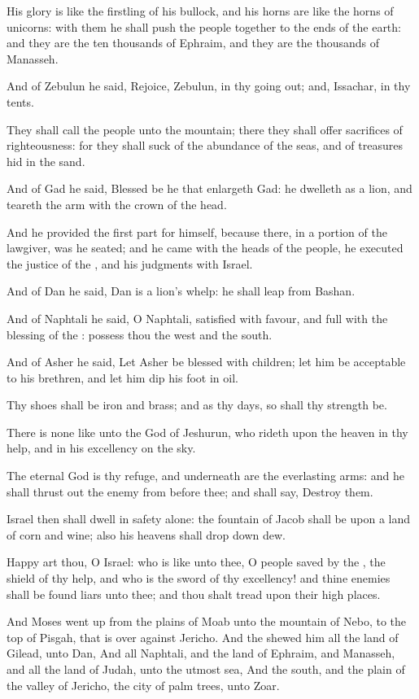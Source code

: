 \Verse His glory is like the firstling of his bullock, and his horns are like the horns of unicorns: with them he shall push the people together to the ends of the earth: and they are the ten thousands of Ephraim, and they are the thousands of Manasseh.

\Verse And of Zebulun he said, Rejoice, Zebulun, in thy going out; and, Issachar, in thy tents.

\Verse They shall call the people unto the mountain; there they shall offer sacrifices of righteousness: for they shall suck of the abundance of the seas, and of treasures hid in the sand.

\Verse And of Gad he said, Blessed be he that enlargeth Gad: he dwelleth as a lion, and teareth the arm with the crown of the head.

\Verse And he provided the first part for himself, because there, in a portion of the lawgiver, was he seated; and he came with the heads of the people, he executed the justice of the \LORD, and his judgments with Israel.

\Verse And of Dan he said, Dan is a lion's whelp: he shall leap from Bashan.

\Verse And of Naphtali he said, O Naphtali, satisfied with favour, and full with the blessing of the \LORD: possess thou the west and the south.

\Verse And of Asher he said, Let Asher be blessed with children; let him be acceptable to his brethren, and let him dip his foot in oil.

\Verse Thy shoes shall be iron and brass; and as thy days, so shall thy strength be.

\Verse There is none like unto the God of Jeshurun, who rideth upon the heaven in thy help, and in his excellency on the sky.

\Verse The eternal God is thy refuge, and underneath are the everlasting arms: and he shall thrust out the enemy from before thee; and shall say, Destroy them.

\Verse Israel then shall dwell in safety alone: the fountain of Jacob shall be upon a land of corn and wine; also his heavens shall drop down dew.

\Verse Happy art thou, O Israel: who is like unto thee, O people saved by the \LORD, the shield of thy help, and who is the sword of thy excellency! and thine enemies shall be found liars unto thee; and thou shalt tread upon their high places.


\Chapter
\Verse And Moses went up from the plains of Moab unto the mountain of Nebo, to the top of Pisgah, that is over against Jericho. And the \LORD shewed him all the land of Gilead, unto Dan, \Verse And all Naphtali, and the land of Ephraim, and Manasseh, and all the land of Judah, unto the utmost sea, \Verse And the south, and the plain of the valley of Jericho, the city of palm trees, unto Zoar.

